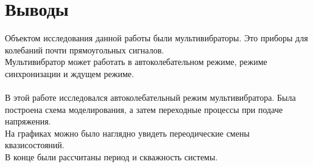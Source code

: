 \documentclass[12pt]{article}
\begin{document}
\section*{Выводы}
Объектом исследования данной работы были мультивибраторы. Это приборы для колебаний почти прямоугольных сигналов. \\
Мультивибратор может работать в автоколебательном режиме, режиме синхронизации и ждущем режиме. \\
\ \\
В этой работе исследовался автоколебательный режим мультивибратора. Была построена схема моделирования, а затем переходные процессы при подаче напряжения. \\
На графиках можно было наглядно увидеть переодические смены квазисостояний.\\
В конце были рассчитаны период и скважность системы.
\end{document}
